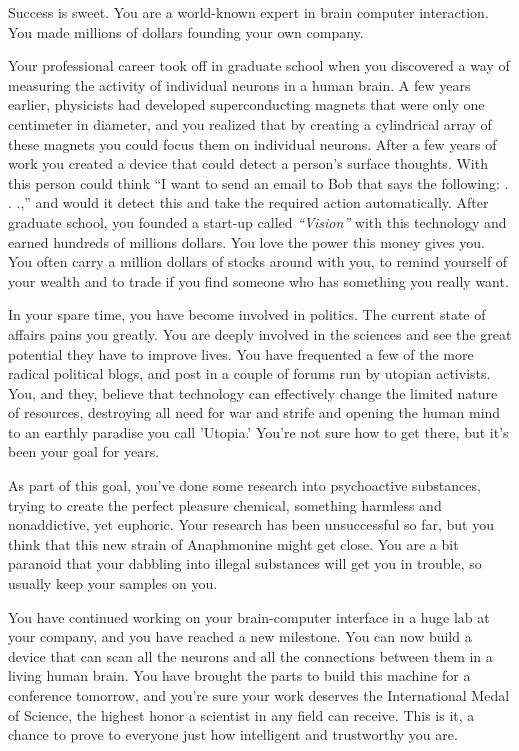\documentclass[char]{guildcamp1}
\begin{document}
\name{\cRival{}}


Success is sweet.  You are a world-known expert in brain computer interaction.  You made millions of dollars founding your own company.  

Your professional career took off in graduate school when you discovered a way of measuring the activity of individual neurons in a human brain.  A few years earlier, physicists had developed superconducting magnets that were only one centimeter in diameter, and you realized that by creating a cylindrical array of these magnets you could focus them on individual neurons.  After a few years of work you created a device that could detect a person's surface thoughts. With this person could think ``I want to send an email to Bob that says the following: . . .,'' and would it detect this and take the required action automatically.  After graduate school, you founded a start-up called {\em ``Vision''} with this technology and earned hundreds of  millions dollars.  You love the power this money gives you.  You often carry a million dollars of stocks around with you, to remind yourself of your wealth and to trade if you find someone who has something you really want.

In your spare time, you have become involved in politics.  The current state of affairs pains you greatly.  You are deeply involved in the sciences and see the great potential they have to improve lives. You have frequented a few of the more radical political blogs, and post in a couple of forums run by utopian activists. You, and they, believe that technology can effectively change the limited nature of resources, destroying all need for war and strife and opening the human mind to an earthly paradise you call 'Utopia.' You're not sure how to get there, but it's been your goal for years.

As part of this goal, you've done some research into psychoactive substances, trying to create the perfect pleasure chemical, something harmless and nonaddictive, yet euphoric. Your research has been unsuccessful so far, but you think that this new strain of Anaphmonine might get close. You are a bit paranoid that your dabbling into illegal substances will get you in trouble, so usually keep your samples on you.

You have continued working on your brain-computer interface in a huge lab at your company, and you have reached a new milestone.  You can now build a device that can scan all the neurons and all the connections between them in a living human brain.  You have brought the parts to build this machine for a conference tomorrow, and you're sure your work deserves the International Medal of Science, the highest honor a scientist in any field can receive.  This is it, a chance to prove to everyone just how intelligent and trustworthy you are.
\end{document}
